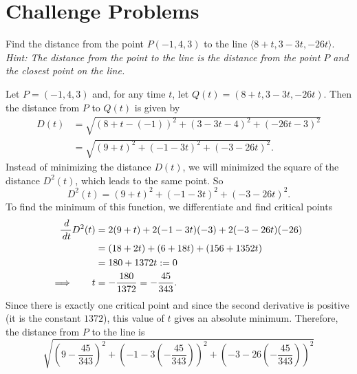 \documentclass[handout]{ximera}
\begin{document}
\begin{instructorNotes}

\end{instructorNotes}




\section{Challenge Problems}

\begin{problem}
Find the distance from the point $P(-1,4,3)$ to the line $\langle 8+t,3-3t,-26t \rangle$.  {\it Hint: The distance from the point to the line is the distance from the point $P$ and the closest point on the line.}
	\begin{freeResponse}
	Let $P = (-1,4,3)$ and, for any time $t$, let $Q(t) = (8+t,3-3t,-26t)$.  
	Then the distance from $P$ to $Q(t)$ is given by
		\begin{align*}
		D(t) &=
		\sqrt{(8+t - (-1))^2 + (3-3t -4)^2 + (-26t-3)^2}  \\
		&= \sqrt{(9+t)^2 + (-1-3t)^2 + (-3-26t)^2}.
		\end{align*}
	Instead of minimizing the distance $D(t)$, we will minimized the square of the distance $D^2(t)$, which leads to the same point.  
	So
		\[
		D^2(t) = (9+t)^2 + (-1-3t)^2 + (-3-26t)^2.
		\]
	To find the minimum of this function, we differentiate and find critical points
		\begin{align*}
		\frac{\,d}{\,d t} D^2(t) &= 2(9+t) + 2(-1-3t)(-3) + 2(-3-26t)(-26)  \\
		&= (18 + 2t) + (6 + 18t) + (156 + 1352t)  \\
		&= 180 + 1372t := 0  \\
		\Longrightarrow \qquad t &= - \frac{180}{1372} = - \frac{45}{343}.
		\end{align*}
	Since there is exactly one critical point and since the second derivative is positive (it is the constant $1372$), this value of $t$ gives an absolute minimum.
	Therefore, the distance from $P$ to the line is
		\[
		\boxed{\sqrt{\left( 9-\frac{45}{343} \right)^2 + \left(-1-3\left( - \frac{45}{343} \right) \right)^2 + \left(-3-26\left( - \frac{45}{343} \right) \right)^2}}
		\]
	\end{freeResponse}
 \end{problem}

\begin{instructorNotes}

\end{instructorNotes}
 
\end{document}
